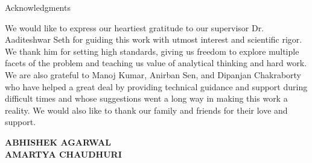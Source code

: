 \begin{center}
\LARGE{Acknowledgments} 
\end{center}

\vspace{0.5in}

We would like to express our heartiest gratitude to our supervisor Dr. Aaditeshwar Seth for guiding this work with utmost interest and scientific rigor. We thank him for setting high standards, giving us freedom to explore multiple facets of the problem and teaching us value of analytical thinking and hard work. We are also grateful to Manoj Kumar, Anirban Sen, and Dipanjan Chakraborty who have helped a great deal by providing technical guidance and support during difficult times and whose suggestions went a long way in making this work a reality. We would also like to thank our family and friends for their love and support.\\

\vspace{1.5in}

{\bfseries ABHISHEK AGARWAL}\\
{\bfseries AMARTYA CHAUDHURI}
